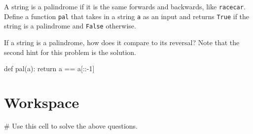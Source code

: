 \documentclass{ximera}
\begin{document}
\begin{question}
A string is a palindrome if it is the same forwards and backwards, like \verb|racecar|. Define a function \verb|pal| that takes in a string \verb|a| as an input and returns \verb|True| if the string is a palindrome and \verb|False| otherwise.
	\begin{hint}
	If a string is a palindrome, how does it compare to its reversal? Note that the second hint for this problem is the solution.
	\end{hint}
	\begin{hint}
\begin{sageCell}
def pal(a):
        return a == a[::-1]
\end{sageCell}
	\end{hint}
\end{question}

\section{Workspace}

\begin{sageCell}
# Use this cell to solve the above questions.
\end{sageCell}
\end{document}
